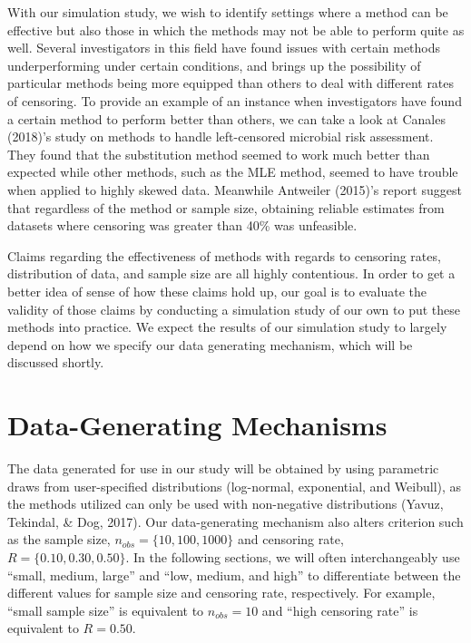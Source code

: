 \documentclass[12pt, twoside]{amherstthesis}
\begin{document}
With our simulation study, we wish to identify settings where a method can be effective but also those in which the methods may not be able to perform quite as well. Several investigators in this field have found issues with certain methods underperforming under certain conditions, and brings up the possibility of particular methods being more equipped than others to deal with different rates of censoring. To provide an example of an instance when investigators have found a certain method to perform better than others, we can take a look at Canales (2018)'s study on methods to handle left-censored microbial risk assessment. They found that the substitution method seemed to work much better than expected while other methods, such as the MLE method, seemed to have trouble when applied to highly skewed data. Meanwhile Antweiler (2015)'s report suggest that regardless of the method or sample size, obtaining reliable estimates from datasets where censoring was greater than 40\% was unfeasible.

Claims regarding the effectiveness of methods with regards to censoring rates, distribution of data, and sample size are all highly contentious. In order to get a better idea of sense of how these claims hold up, our goal is to evaluate the validity of those claims by conducting a simulation study of our own to put these methods into practice. We expect the results of our simulation study to largely depend on how we specify our data generating mechanism, which will be discussed shortly.

\hypertarget{data_generating_mechanisms}{%
\section{Data-Generating Mechanisms}\label{data_generating_mechanisms}}

The data generated for use in our study will be obtained by using parametric draws from user-specified distributions (log-normal, exponential, and Weibull), as the methods utilized can only be used with non-negative distributions (Yavuz, Tekindal, \& Dog, 2017). Our data-generating mechanism also alters criterion such as the sample size, \(n_{obs} = \{10, 100, 1000\}\) and censoring rate, \(R = \{0.10, 0.30, 0.50\}\). In the following sections, we will often interchangeably use ``small, medium, large'' and ``low, medium, and high'' to differentiate between the different values for sample size and censoring rate, respectively. For example, ``small sample size'' is equivalent to \(n_{obs} = 10\) and ``high censoring rate'' is equivalent to \(R = {0.50}\).
\end{document}
